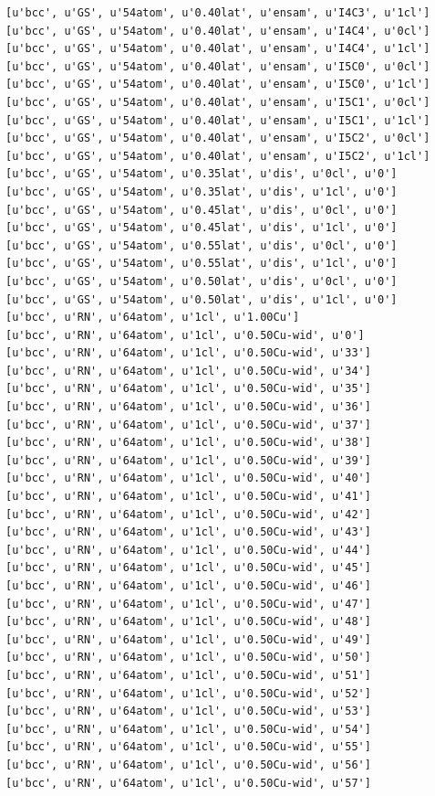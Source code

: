 \documentclass[number, sort&compress, review, 12pt]{elsarticle}
\begin{document}
\begin{verbatim}
[u'bcc', u'GS', u'54atom', u'0.40lat', u'ensam', u'I4C3', u'1cl']
[u'bcc', u'GS', u'54atom', u'0.40lat', u'ensam', u'I4C4', u'0cl']
[u'bcc', u'GS', u'54atom', u'0.40lat', u'ensam', u'I4C4', u'1cl']
[u'bcc', u'GS', u'54atom', u'0.40lat', u'ensam', u'I5C0', u'0cl']
[u'bcc', u'GS', u'54atom', u'0.40lat', u'ensam', u'I5C0', u'1cl']
[u'bcc', u'GS', u'54atom', u'0.40lat', u'ensam', u'I5C1', u'0cl']
[u'bcc', u'GS', u'54atom', u'0.40lat', u'ensam', u'I5C1', u'1cl']
[u'bcc', u'GS', u'54atom', u'0.40lat', u'ensam', u'I5C2', u'0cl']
[u'bcc', u'GS', u'54atom', u'0.40lat', u'ensam', u'I5C2', u'1cl']
[u'bcc', u'GS', u'54atom', u'0.35lat', u'dis', u'0cl', u'0']
[u'bcc', u'GS', u'54atom', u'0.35lat', u'dis', u'1cl', u'0']
[u'bcc', u'GS', u'54atom', u'0.45lat', u'dis', u'0cl', u'0']
[u'bcc', u'GS', u'54atom', u'0.45lat', u'dis', u'1cl', u'0']
[u'bcc', u'GS', u'54atom', u'0.55lat', u'dis', u'0cl', u'0']
[u'bcc', u'GS', u'54atom', u'0.55lat', u'dis', u'1cl', u'0']
[u'bcc', u'GS', u'54atom', u'0.50lat', u'dis', u'0cl', u'0']
[u'bcc', u'GS', u'54atom', u'0.50lat', u'dis', u'1cl', u'0']
[u'bcc', u'RN', u'64atom', u'1cl', u'1.00Cu']
[u'bcc', u'RN', u'64atom', u'1cl', u'0.50Cu-wid', u'0']
[u'bcc', u'RN', u'64atom', u'1cl', u'0.50Cu-wid', u'33']
[u'bcc', u'RN', u'64atom', u'1cl', u'0.50Cu-wid', u'34']
[u'bcc', u'RN', u'64atom', u'1cl', u'0.50Cu-wid', u'35']
[u'bcc', u'RN', u'64atom', u'1cl', u'0.50Cu-wid', u'36']
[u'bcc', u'RN', u'64atom', u'1cl', u'0.50Cu-wid', u'37']
[u'bcc', u'RN', u'64atom', u'1cl', u'0.50Cu-wid', u'38']
[u'bcc', u'RN', u'64atom', u'1cl', u'0.50Cu-wid', u'39']
[u'bcc', u'RN', u'64atom', u'1cl', u'0.50Cu-wid', u'40']
[u'bcc', u'RN', u'64atom', u'1cl', u'0.50Cu-wid', u'41']
[u'bcc', u'RN', u'64atom', u'1cl', u'0.50Cu-wid', u'42']
[u'bcc', u'RN', u'64atom', u'1cl', u'0.50Cu-wid', u'43']
[u'bcc', u'RN', u'64atom', u'1cl', u'0.50Cu-wid', u'44']
[u'bcc', u'RN', u'64atom', u'1cl', u'0.50Cu-wid', u'45']
[u'bcc', u'RN', u'64atom', u'1cl', u'0.50Cu-wid', u'46']
[u'bcc', u'RN', u'64atom', u'1cl', u'0.50Cu-wid', u'47']
[u'bcc', u'RN', u'64atom', u'1cl', u'0.50Cu-wid', u'48']
[u'bcc', u'RN', u'64atom', u'1cl', u'0.50Cu-wid', u'49']
[u'bcc', u'RN', u'64atom', u'1cl', u'0.50Cu-wid', u'50']
[u'bcc', u'RN', u'64atom', u'1cl', u'0.50Cu-wid', u'51']
[u'bcc', u'RN', u'64atom', u'1cl', u'0.50Cu-wid', u'52']
[u'bcc', u'RN', u'64atom', u'1cl', u'0.50Cu-wid', u'53']
[u'bcc', u'RN', u'64atom', u'1cl', u'0.50Cu-wid', u'54']
[u'bcc', u'RN', u'64atom', u'1cl', u'0.50Cu-wid', u'55']
[u'bcc', u'RN', u'64atom', u'1cl', u'0.50Cu-wid', u'56']
[u'bcc', u'RN', u'64atom', u'1cl', u'0.50Cu-wid', u'57']

\end{verbatim}
\end{document}
